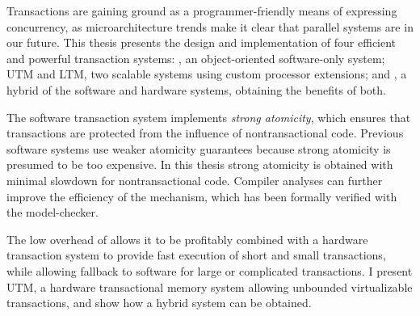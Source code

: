 {\sis

Transactions are gaining ground as a programmer-friendly means of
expressing concurrency, as microarchitecture trends make it
clear that parallel systems are in our future.  This thesis
presents the design and implementation of four efficient and powerful
transaction systems: \apex, an object-oriented software-only system;
UTM and LTM, two scalable systems using custom processor extensions;
and \hyx, a hybrid of the software and hardware systems,
obtaining the benefits of both.

The software transaction system implements \textit{strong atomicity},
which ensures that transactions are protected from the influence of
nontransactional code.  Previous software systems use weaker
atomicity guarantees because strong atomicity is presumed to be too
expensive.  In this thesis strong atomicity is obtained with
minimal slowdown for nontransactional code.  Compiler analyses can
further improve the efficiency of the mechanism, which has been
formally verified with the \Spin model-checker.

The low overhead of \apex allows it to be profitably
combined with a hardware transaction system to provide fast execution
of short and small transactions, while allowing fallback to software
for large or complicated transactions.  I present UTM, a hardware
transactional memory system allowing unbounded virtualizable
transactions, and show how a hybrid system can be obtained.

}

